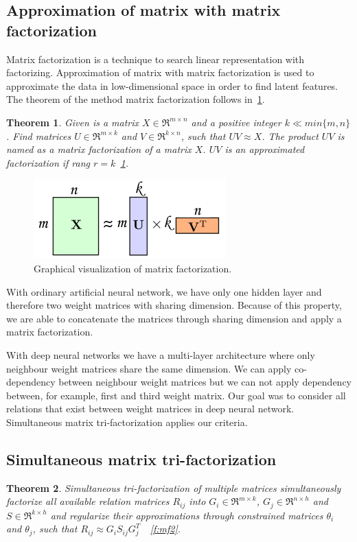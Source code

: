 \documentclass{article} %
\newtheorem{theorem}{Theorem}[section]
\begin{document}
\subsection{Approximation of matrix with matrix factorization}
Matrix factorization is a technique to search linear representation with 
factorizing. Approximation of matrix with matrix factorization is used to 
approximate the data in low-dimensional space in order to find latent features. 
The theorem of the method matrix factorization follows in~\ref{t:1}.

\begin{theorem}\label{t:1}
Given is a matrix $X \in \Re^{m \times n}$ and a positive integer $k \ll 
min\{m,n\}$. Find matrices $U \in \Re^{m \times k}$ and $V \in \Re^{k \times 
n}$, such that $UV \approx X$. The product $UV$ is named as a matrix 
factorization of a matrix $X$. $UV$ is an approximated factorization if 
rang $r = k$~\ref{f:mf1}.
\end{theorem}
\begin{figure}[!ht]
\centering 
\includegraphics[width=.4\textwidth]{mf1.png}
\caption{Graphical visualization of matrix factorization.}
\label{f:mf1}
\end{figure}

With ordinary artificial neural network, we have only one hidden layer and 
therefore two weight matrices with sharing dimension. 
Because of this property, we are able to concatenate the matrices through 
sharing dimension and apply a matrix factorization. 

With deep neural networks we 
have a multi-layer architecture where only neighbour weight matrices share the same dimension. We can apply co-dependency between neighbour 
weight matrices but we can not apply dependency between, for example, first and 
third weight matrix. Our goal was to consider all relations that exist between weight matrices in deep neural network. Simultaneous matrix tri-factorization applies our criteria.


\subsection{Simultaneous matrix tri-factorization}

\begin{theorem}\label{t:2}
Simultaneous tri-factorization of multiple matrices simultaneously 
factorize all available relation matrices $R_{ij}$ into $G_i \in \Re^{m \times 
k}$, $G_j \in \Re^{n \times h}$ and $S \in \Re^{k \times h}$ and regularize 
their approximations through constrained matrices $\theta_i$ and $\theta_j$, 
such that $R_{ij} \approx G_iS_{ij}G_j^T$~\cite{zitnik2015data}~\ref{f:mf2}.
\end{theorem} 
\end{document}
